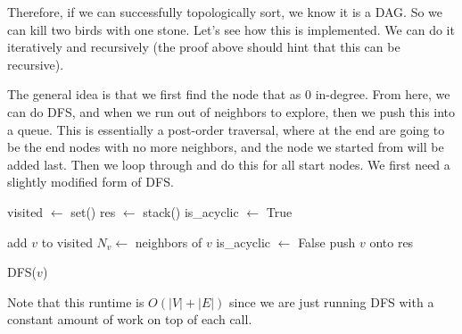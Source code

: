   Therefore, if we can successfully topologically sort, we know it is a DAG. So we can kill two birds with one stone. Let's see how this is implemented. We can do it iteratively and recursively (the proof above should hint that this can be recursive). 

  \begin{algo}
    The general idea is that we first find the node that as $0$ in-degree. From here, we can do DFS, and when we run out of neighbors to explore, then we push this into a queue. This is essentially a post-order traversal, where at the end are going to be the end nodes with no more neighbors, and the node we started from will be added last. Then we loop through and do this for all start nodes. We first need a slightly modified form of DFS. 

    \begin{algorithm}[H]
      \label{alg:iterative_top_sort}
      \begin{algorithmic}[1]
        \State visited $\gets$ set()
        \State res $\gets$ stack() 
        \State is\_acyclic $\gets$ True

            \State add $v$ to visited 
            \State $N_v \gets$ neighbors of $v$ 
                \State is\_acyclic $\gets$ False 
              \EndIf
              \State {}
            \EndFor 
            \State push $v$ onto res
          \EndIf
        \EndFunction

        \State 

            \State DFS($v$)
          \EndFor
            \State {}
          \EndIf
          \State {}
        \EndFunction
      \end{algorithmic}
    \end{algorithm}
    Note that this runtime is $O(|V| + |E|)$ since we are just running DFS with a constant amount of work on top of each call. 
  \end{algo}

